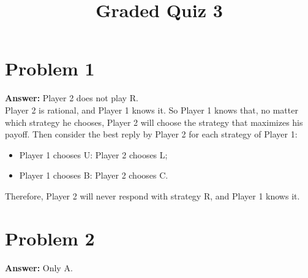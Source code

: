 \documentclass[11pt]{article}
\date{}
\title{Graded Quiz 3}
\begin{document}
\thispagestyle{empty}
\pagestyle{empty}
\section*{Problem 1}
\label{sec:org43b4c7f}

\textbf{Answer:} Player 2 does not play R.\\

Player 2 is rational, and Player 1 knows it. So Player 1 knows that, no matter
which strategy he chooses, Player 2 will choose the strategy that maximizes his
payoff. Then consider the best reply by Player 2 for each strategy of Player 1:
\begin{itemize}
\item Player 1 chooses U: Player 2 chooses L;
\item Player 1 chooses B: Player 2 chooses C.
\end{itemize}
Therefore, Player 2 will never respond with strategy R, and Player 1 knows it.
\section*{Problem 2}
\label{sec:org26b23dd}

\textbf{Answer:} Only A.\\
\end{document}
